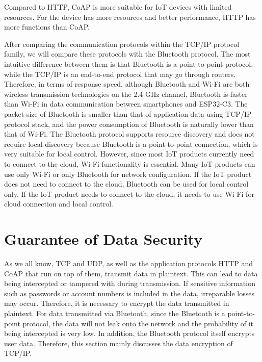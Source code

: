 \documentclass[a4paper,12pt]{book}
\begin{document}
Compared to HTTP, CoAP is more suitable for IoT devices with limited resources. For the device has more resources and better performance, HTTP has more functions than CoAP.

After comparing the communication protocols within the TCP/IP protocol family, we will compare these protocols with the Bluetooth protocol. The most intuitive difference between them is that Bluetooth is a point-to-point protocol, while the TCP/IP is an end-to-end protocol that may go through routers. Therefore, in terms of response speed, although Bluetooth and Wi-Fi are both wireless transmission technologies on the 2.4 GHz channel, Bluetooth is faster than Wi-Fi in data communication between smartphones and ESP32-C3. The packet size of Bluetooth is smaller than that of application data using TCP/IP protocol stack, and the power consumption of Bluetooth is naturally lower than that of Wi-Fi. The Bluetooth protocol supports resource discovery and does not require local discovery because Bluetooth is a point-to-point connection, which is very suitable for local control. However, since most IoT products currently need to connect to the cloud, Wi-Fi functionality is essential. Many IoT products can use only Wi-Fi or only Bluetooth for network configuration. If the IoT product does not need to connect to the cloud, Bluetooth can be used for local control only. If the IoT product needs to connect to the cloud, it needs to use Wi-Fi for cloud connection and local control.

\section{Guarantee of Data Security}
As we all know, TCP and UDP, as well as the application protocols HTTP and CoAP that run on top of them, transmit data in plaintext. This can lead to data being intercepted or tampered with during transmission. If sensitive information such as passwords or account numbers is included in the data, irreparable losses may occur. Therefore, it is necessary to encrypt the data transmitted in plaintext. For data transmitted via Bluetooth, since the Bluetooth is a point-to-point protocol, the data will not leak onto the network and the probability of it being intercepted is very low. In addition, the Bluetooth protocol itself encrypts user data. Therefore, this section mainly discusses the data encryption of TCP/IP.
\end{document}
